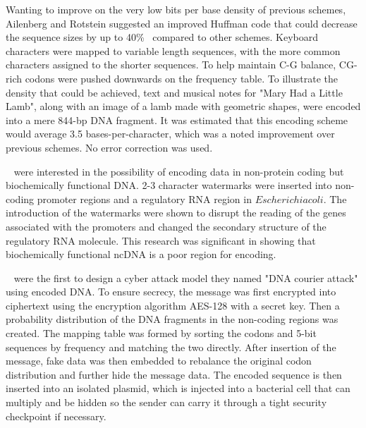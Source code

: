 \documentclass{bioinfo}
\begin{document}
Wanting to improve on the very low bits per base density of previous schemes, Ailenberg and Rotstein suggested an improved Huffman code that could decrease the sequence sizes by up to 40\%~\cite{AR2009BT} compared to other schemes. Keyboard characters were mapped to variable length sequences, with the more common characters assigned to the shorter sequences. To help maintain C-G balance, CG-rich codons were pushed downwards on the frequency table. To illustrate the density that could be achieved, text and musical notes for "Mary Had a Little Lamb", along with an image of a lamb made with geometric shapes, were encoded into a mere 844-bp DNA fragment. It was estimated that this encoding scheme would average 3.5 bases-per-character, which was a noted improvement over previous schemes. No error correction was used.

~\cite{HPB2009BMCRN} were interested in the possibility of encoding data in non-protein coding but biochemically functional DNA. 2-3 character watermarks were inserted into non-coding promoter regions and a regulatory RNA region in $Escherichia coli$. The introduction of the watermarks were shown to disrupt the reading of the genes associated with the promoters and changed the secondary structure of the regulatory RNA molecule. This research was significant in showing that biochemically functional ncDNA is a poor region for encoding.

~\cite{CLY2015SAPW} were the first to design a cyber attack model they named "DNA courier attack" using encoded DNA. To ensure secrecy, the message was first encrypted into ciphertext using the encryption algorithm AES-128 with a secret key. Then a probability distribution of the DNA fragments in the non-coding regions was created. The mapping table was formed by sorting the codons and 5-bit sequences by frequency and matching the two directly. After insertion of the message, fake data was then embedded to rebalance the original codon distribution and further hide the message data. The encoded sequence is then inserted into an isolated plasmid, which is injected into a bacterial cell that can multiply and be hidden so the sender can carry it through a tight security checkpoint if necessary.
\end{document}
